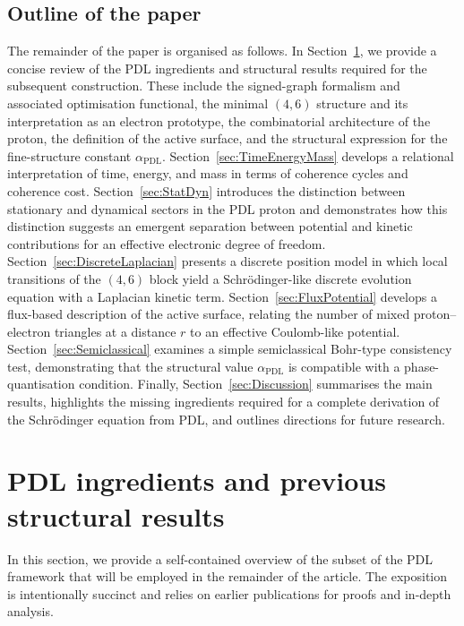 \documentclass[11pt,a4paper]{article}
\begin{document}
\subsection{Outline of the paper}

The remainder of the paper is organised as follows. In Section~\ref{sec:PDLingr}, we provide a concise review of the PDL ingredients and structural results required for the subsequent construction. These include the signed-graph formalism and associated optimisation functional, the minimal $(4,6)$ structure and its interpretation as an electron prototype, the combinatorial architecture of the proton, the definition of the active surface, and the structural expression for the fine-structure constant $\alpha_{\mathrm{PDL}}$.\cite{Laubscher2026IntroPDL,Laubscher2026PDL_English,Laubscher2026LDP_French,Laubscher2026DerivationAlpha} Section~\ref{sec:TimeEnergyMass} develops a relational interpretation of time, energy, and mass in terms of coherence cycles and coherence cost. Section~\ref{sec:StatDyn} introduces the distinction between stationary and dynamical sectors in the PDL proton and demonstrates how this distinction suggests an emergent separation between potential and kinetic contributions for an effective electronic degree of freedom. Section~\ref{sec:DiscreteLaplacian} presents a discrete position model in which local transitions of the $(4,6)$ block yield a Schr\"odinger-like discrete evolution equation with a Laplacian kinetic term. Section~\ref{sec:FluxPotential} develops a flux-based description of the active surface, relating the number of mixed proton--electron triangles at a distance $r$ to an effective Coulomb-like potential. Section~\ref{sec:Semiclassical} examines a simple semiclassical Bohr-type consistency test, demonstrating that the structural value $\alpha_{\mathrm{PDL}}$ is compatible with a phase-quantisation condition. Finally, Section~\ref{sec:Discussion} summarises the main results, highlights the missing ingredients required for a complete derivation of the Schr\"odinger equation from PDL, and outlines directions for future research.

\section{PDL ingredients and previous structural results}
\label{sec:PDLingr}

In this section, we provide a self-contained overview of the subset of the PDL framework that will be employed in the remainder of the article. The exposition is intentionally succinct and relies on earlier publications for proofs and in-depth analysis.\cite{Laubscher2026IntroPDL,Laubscher2026PDL_English,Laubscher2026LDP_French,Laubscher2026DerivationAlpha}
\end{document}
